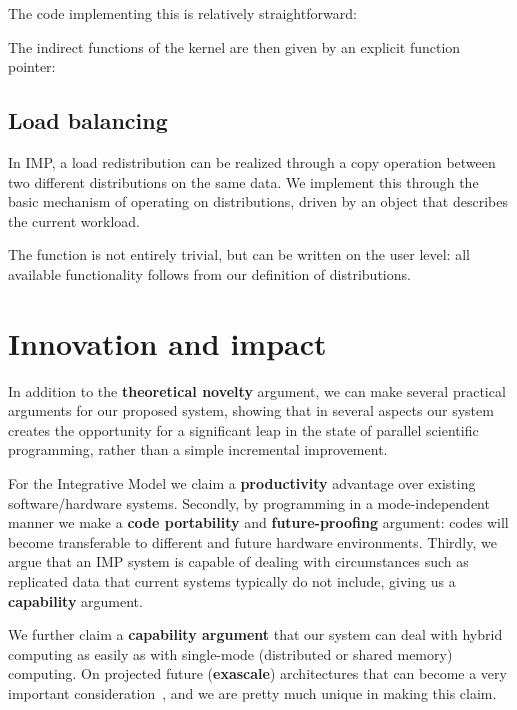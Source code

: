 \documentclass[11pt,fleqn,preprint]{impreport}
\begin{document}
The code implementing this is relatively straightforward:
%

The indirect functions of the kernel are then given by
an explicit function pointer:
%

\subsection{Load balancing}

In IMP, a load redistribution can be realized through a copy operation
between two different distributions on the same data.
We implement this through the basic mechanism of operating on
distributions, driven by an object that describes the current
workload.


The  function is not entirely trivial, but can
be written on the user level: all available functionality follows from
our definition of distributions.

\section{Innovation and impact}

In addition to the \textbf{theoretical novelty} argument,
we can make several practical arguments for our proposed system, 
showing that in several aspects our system creates the opportunity for
a significant leap in the state of parallel scientific programming,
rather than a simple incremental improvement.

For the Integrative Model
we claim a \textbf{productivity} advantage over
existing software/hardware systems. Secondly, by programming in a
mode-independent manner we make a \textbf{code portability} and
\textbf{future-proofing} argument: codes will become transferable to
different and future hardware environments. Thirdly, we argue that an IMP
system is capable of dealing with circumstances such as replicated data
that current systems typically do not include, giving us a
\textbf{capability} argument.

We further claim a \textbf{capability argument} that 
our system can deal with hybrid computing as easily
as with single-mode (distributed or shared memory) computing. On
projected future (\textbf{exascale}) architectures that can become a very important
consideration~\cite{Kogge:newnormal}, and we are pretty much unique in making this claim.
\end{document}
